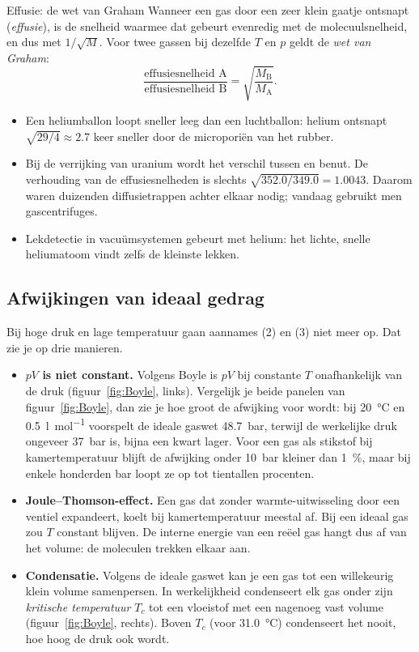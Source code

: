 \begin{toepassing}{Effusie: de wet van Graham}
Wanneer een gas door een zeer klein gaatje ontsnapt (\emph{effusie}), is de snelheid waarmee dat gebeurt evenredig met de molecuulsnelheid, en dus met $1/\sqrt{M}$. Voor twee gassen bij dezelfde $T$ en $p$ geldt de \emph{wet van Graham}:
\begin{equation}
\frac{\text{effusiesnelheid A}}{\text{effusiesnelheid B}} = \sqrt{\frac{M_\mathrm{B}}{M_\mathrm{A}}}.
\end{equation}
\begin{itemize}
\item Een heliumballon loopt sneller leeg dan een luchtballon: helium ontsnapt $\sqrt{29/4}\approx 2.7$ keer sneller door de microporiën van het rubber.
\item Bij de verrijking van uranium wordt het verschil tussen  en  benut. De verhouding van de effusiesnelheden is slechts $\sqrt{352.0/349.0} = 1.0043$. Daarom waren duizenden diffusietrappen achter elkaar nodig; vandaag gebruikt men gascentrifuges.
\item Lekdetectie in vacu\"umsystemen gebeurt met helium: het lichte, snelle heliumatoom vindt zelfs de kleinste lekken.
\end{itemize}
\end{toepassing}

\subsection{Afwijkingen van ideaal gedrag}

Bij hoge druk en lage temperatuur gaan aannames (2) en (3) niet meer op. Dat zie je op drie manieren.
\begin{itemize}
\item \textbf{$pV$ is niet constant.} Volgens Boyle is $pV$ bij constante $T$ onafhankelijk van de druk (figuur~\ref{fig:Boyle}, links). Vergelijk je beide panelen van figuur~\ref{fig:Boyle}, dan zie je hoe groot de afwijking voor  wordt: bij \SI{20}{\celsius} en \SI{0.5}{\litre\per\mole} voorspelt de ideale gaswet \SI{48.7}{\bar}, terwijl de werkelijke druk ongeveer \SI{37}{\bar} is, bijna een kwart lager. Voor een gas als stikstof bij kamertemperatuur blijft de afwijking onder \SI{10}{\bar} kleiner dan \SI{1}{\percent}, maar bij enkele honderden bar loopt ze op tot tientallen procenten.
\item \textbf{Joule--Thomson-effect.} Een gas dat zonder warmte-uitwisseling door een ventiel expandeert, koelt bij kamertemperatuur meestal af. Bij een ideaal gas zou $T$ constant blijven. De interne energie van een re\"eel gas hangt dus af van het volume: de moleculen trekken elkaar aan.
\item \textbf{Condensatie.} Volgens de ideale gaswet kan je een gas tot een willekeurig klein volume samenpersen. In werkelijkheid condenseert elk gas onder zijn \emph{kritische temperatuur} $T_c$ tot een vloeistof met een nagenoeg vast volume (figuur~\ref{fig:Boyle}, rechts). Boven $T_c$ (voor  \SI{31.0}{\celsius}) condenseert het nooit, hoe hoog de druk ook wordt.
\end{itemize}

